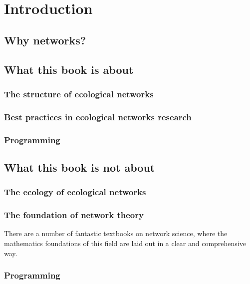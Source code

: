 \chapter{Introduction\label{chap:introduction}}

\parencite{DelmBess18}

\section{Why networks?}

\section{What this book is about}

\subsection{The structure of ecological networks}

\subsection{Best practices in ecological networks research}

\subsection{Programming}

\section{What this book is not about}

\subsection{The ecology of ecological networks}

\subsection{The foundation of network theory}

There are a number of fantastic textbooks on network science, where the
mathematics foundations of this field are laid out in a clear and comprehensive
way.

\subsection{Programming}

